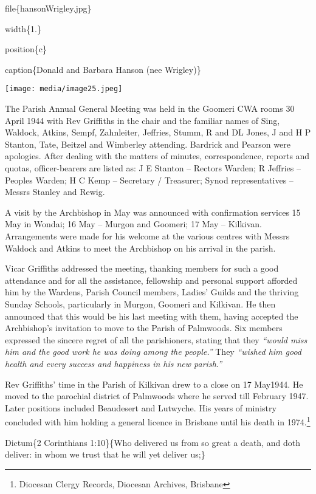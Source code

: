 file\{hansonWrigley.jpg\}

width\{1.\}

position\{c\}

caption\{Donald and Barbara Hanson (nee Wrigley)\}

\texttt{[image: media/image25.jpeg]}

The Parish Annual General Meeting was held in the Goomeri CWA rooms 30 April 1944 with Rev Griffiths in the chair and the familiar names of Sing, Waldock, Atkins, Sempf, Zahnleiter, Jeffries, Stumm, R and DL Jones, J and H P Stanton, Tate, Beitzel and Wimberley attending. Bardrick and Pearson were apologies. After dealing with the matters of minutes, correspondence, reports and quotas, officer-bearers are listed as: J E Stanton -- Rectors Warden; R Jeffries -- Peoples Warden; H C Kemp -- Secretary / Treasurer; Synod representatives -- Messrs Stanley and Rewig.

A visit by the Archbishop in May was announced with confirmation services 15 May in Wondai; 16 May -- Murgon and Goomeri; 17 May -- Kilkivan. Arrangements were made for his welcome at the various centres with Messrs Waldock and Atkins to meet the Archbishop on his arrival in the parish.

Vicar Griffiths addressed the meeting, thanking members for such a good attendance and for all the assistance, fellowship and personal support afforded him by the Wardens, Parish Council members, Ladies' Guilds and the thriving Sunday Schools, particularly in Murgon, Goomeri and Kilkivan. He then announced that this would be his last meeting with them, having accepted the Archbishop's invitation to move to the Parish of Palmwoods. Six members expressed the sincere regret of all the parishioners, stating that they \emph{``would miss him and the good work he was doing among the people.''} They \emph{``wished him good health and every success and happiness in his new parish.''}

Rev Griffiths' time in the Parish of Kilkivan drew to a close on 17 May1944. He moved to the parochial district of Palmwoods where he served till February 1947. Later positions included Beaudesert and Lutwyche. His years of ministry concluded with him holding a general licence in Brisbane until his death in 1974.\footnote{Diocesan Clergy Records, Diocesan Archives, Brisbane}

Dictum\{2 Corinthians 1:10\}\{Who delivered us from so great a death, and doth deliver: in whom we trust that he will yet deliver us;\}

